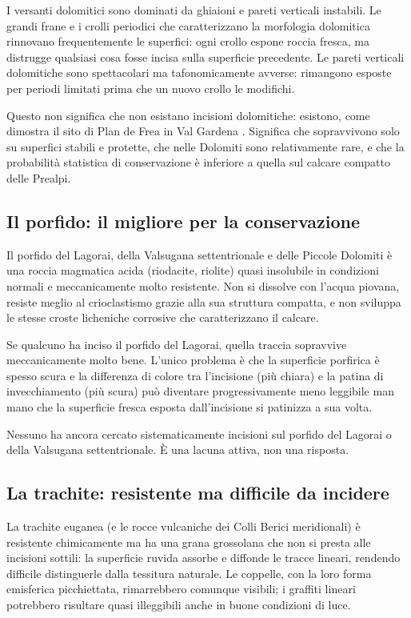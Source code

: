 I versanti dolomitici sono dominati da ghiaioni e pareti verticali instabili. Le grandi frane e i crolli periodici che caratterizzano la morfologia dolomitica rinnovano frequentemente le superfici: ogni crollo espone roccia fresca, ma distrugge qualsiasi cosa fosse incisa sulla superficie precedente. Le pareti verticali dolomitiche sono spettacolari ma tafonomicamente avverse: rimangono esposte per periodi limitati prima che un nuovo crollo le modifichi.

Questo non significa che non esistano incisioni dolomitiche: esistono, come dimostra il sito di Plan de Frea in Val Gardena \citep{kompatscher2007}. Significa che sopravvivono solo su superfici stabili e protette, che nelle Dolomiti sono relativamente rare, e che la probabilità statistica di conservazione è inferiore a quella sul calcare compatto delle Prealpi.

\subsection{Il porfido: il migliore per la conservazione}

Il porfido del Lagorai, della Valsugana settentrionale e delle Piccole Dolomiti è una roccia magmatica acida (riodacite, riolite) quasi insolubile in condizioni normali e meccanicamente molto resistente. Non si dissolve con l'acqua piovana, resiste meglio al crioclastismo grazie alla sua struttura compatta, e non sviluppa le stesse croste licheniche corrosive che caratterizzano il calcare.

Se qualcuno ha inciso il porfido del Lagorai, quella traccia sopravvive meccanicamente molto bene. L'unico problema è che la superficie porfirica è spesso scura e la differenza di colore tra l'incisione (più chiara) e la patina di invecchiamento (più scura) può diventare progressivamente meno leggibile man mano che la superficie fresca esposta dall'incisione si patinizza a sua volta.

Nessuno ha ancora cercato sistematicamente incisioni sul porfido del Lagorai o della Valsugana settentrionale. È una lacuna attiva, non una risposta.

\subsection{La trachite: resistente ma difficile da incidere}

La trachite euganea (e le rocce vulcaniche dei Colli Berici meridionali) è resistente chimicamente ma ha una grana grossolana che non si presta alle incisioni sottili: la superficie ruvida assorbe e diffonde le tracce lineari, rendendo difficile distinguerle dalla tessitura naturale. Le coppelle, con la loro forma emisferica picchiettata, rimarrebbero comunque visibili; i graffiti lineari potrebbero risultare quasi illeggibili anche in buone condizioni di luce.

